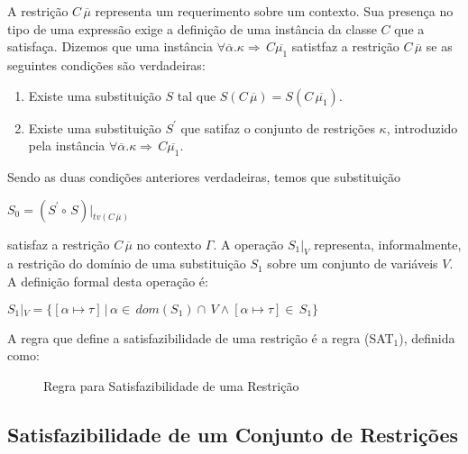 A restri\c{c}\~ao $C\,\overline{\mu}$ representa um requerimento sobre um contexto. Sua presen\c{c}a no tipo de uma
express\~ao exige a defini\c{c}\~ao de uma inst\^ancia da classe $C$ que a satisfa\c{c}a. Dizemos que uma inst\^ancia 
$\forall\overline{\alpha}.\kappa\Rightarrow\,C\overline{\mu_{1}}$ satistfaz a restri\c{c}\~ao $C\,\overline{\mu}$ se
as seguintes condi\c{c}\~oes s\~ao verdadeiras:
\begin{enumerate} 
	\item Existe uma substitui\c{c}\~ao $S$ tal que $S(C\,\overline{\mu})=S(C\,\overline{\mu_{1}})$.
	\item Existe uma substitui\c{c}\~ao $S^{\prime}$ que satifaz o conjunto de restri\c{c}\~oes $\kappa$, 
	      introduzido pela inst\^ancia $\forall\overline{\alpha}.\kappa\Rightarrow\,C\overline{\mu_{1}}$.
\end{enumerate}
Sendo as duas condi\c{c}\~oes anteriores verdadeiras, temos que substitui\c{c}\~ao
\begin{center} 
	$S_{0}=(S^{\prime}\circ\,S)|_{tv(C\,\overline{\mu})}$ 
\end{center}
satisfaz a restri\c{c}\~ao $C\,\overline{\mu}$ no contexto $\Gamma$. A opera\c{c}\~ao $S_{1}|_{V}$ representa,
informalmente,  a restri\c{c}\~ao do dom\'inio de uma substitui\c{c}\~ao $S_{1}$ sobre um conjunto de vari\'aveis $V$. 
A defini\c{c}\~ao formal desta opera\c{c}\~ao \'e:
\begin{center}
	$S_{1}|_{V} =\{[\alpha\mapsto\tau]\,|\,\alpha\in\,dom(S_{1})\cap\,V\land [\alpha\mapsto\tau]\in\,S_{1}\}$
\end{center}

A regra que define a satisfazibilidade de uma restri\c{c}\~ao \'e a regra (SAT$_{1}$), definida como:

\begin{figure}[h]
	\begin{prooftree}
	\end{prooftree}
\caption{Regra para Satisfazibilidade de uma Restri\c{c}\~ao}
\label{figsatone}
\end{figure}


\subsection{Satisfazibilidade de um Conjunto de Restri\c{c}\~oes}\label{satset}  

